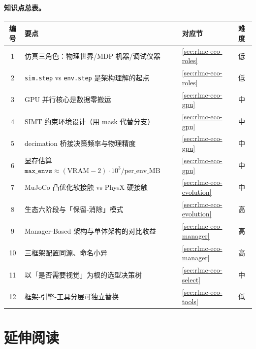 \paragraph{知识点总表。}
\begin{center}
\small
\begin{tabular}{@{}clll@{}}
\toprule
编号 & 要点 & 对应节 & 难度 \\
\midrule
1 & 仿真三角色：物理世界/MDP 机器/调试仪器 & \cref{sec:rlmc-eco-roles} & 低 \\
2 & \verb|sim.step| vs \verb|env.step| 是架构理解的起点 & \cref{sec:rlmc-eco-roles} & 低 \\
3 & GPU 并行核心是数据零搬运 & \cref{sec:rlmc-eco-gpu} & 中 \\
4 & SIMT 约束环境设计（用 mask 代替分支） & \cref{sec:rlmc-eco-gpu} & 中 \\
5 & decimation 桥接决策频率与物理精度 & \cref{sec:rlmc-eco-gpu} & 中 \\
6 & 显存估算 $\texttt{max\_envs}\approx(\text{VRAM}-2)\cdot10^3/\text{per\_env\_MB}$ & \cref{sec:rlmc-eco-gpu} & 中 \\
7 & MuJoCo 凸优化软接触 vs PhysX 硬接触 & \cref{sec:rlmc-eco-evolution} & 中 \\
8 & 生态六阶段与「保留-消除」模式 & \cref{sec:rlmc-eco-evolution} & 高 \\
9 & Manager-Based 架构与单体架构的对比收益 & \cref{sec:rlmc-eco-manager} & 高 \\
10 & 三框架配置同源、命名小异 & \cref{sec:rlmc-eco-manager} & 高 \\
11 & 以「是否需要视觉」为根的选型决策树 & \cref{sec:rlmc-eco-select} & 中 \\
12 & 框架-引擎-工具分层可独立替换 & \cref{sec:rlmc-eco-tools} & 低 \\
\bottomrule
\end{tabular}
\end{center}

\section*{延伸阅读}
\label{sec:rlmc-eco-further}

